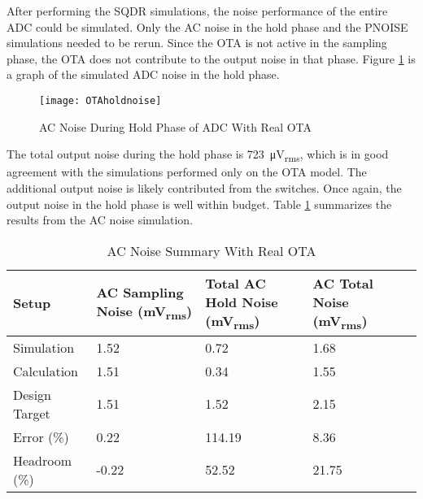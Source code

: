 After performing the SQDR simulations, the noise performance of the entire ADC could be simulated. Only the AC noise in the hold phase and the PNOISE simulations needed to be rerun. Since the OTA is not active in the sampling phase, the OTA does not contribute to the output noise in that phase. Figure \ref{fig:otaholdnoise} is a graph of the simulated ADC noise in the hold phase.
\begin{figure}[htbp]
\centering
\texttt{[image: OTAholdnoise]}
\caption{AC Noise During Hold Phase of ADC With Real OTA } 
\label{fig:otaholdnoise}
\end{figure}
The total output noise during the hold phase is \SI{723}{\micro\volt_{rms}}, which is in good agreement with the simulations performed only on the OTA model. The additional output noise is likely contributed from the switches. Once again, the output noise in the hold phase is well within budget. Table \ref{tab:acnoisesummaryrealota} summarizes the results from the AC noise simulation.
\begin{table}[htbp]
\begin{center}
\begin{tabularx}{\linewidth}{|l|X|X|X|X|}
\hline
Setup & AC Sampling Noise (\si{\milli\volt_{rms}}) & Total AC Hold Noise  (\si{\milli\volt_{rms}}) & AC Total Noise  (\si{\milli\volt_{rms}}) \\ \hline
Simulation & 1.52 & 0.72 & 1.68 \\ \hline
Calculation & 1.51 & 0.34 & 1.55 \\ \hline
Design Target & 1.51 & 1.52 & 2.15 \\ \hline
Error (\%) & 0.22 & 114.19 & 8.36 \\ \hline
Headroom (\%) & -0.22 & 52.52 & 21.75 \\ \hline
\end{tabularx}
\caption{AC Noise Summary With Real OTA}
\label{tab:acnoisesummaryrealota}
\end{center}
\end{table}

